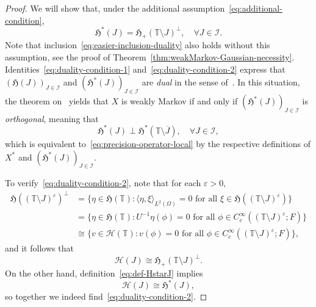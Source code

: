 \documentclass[reqno]{amsart}
\numberwithin{equation}{section}
\newcommand{\bbT}{\mathbb{T}}
\newcommand{\cH}{\mathcal{H}}
\newcommand{\scalar}[2]{     \langle #1       \rangle_{ #2 }}
\newcommand{\clos}[1]{\overline{ #1 }}
\theoremstyle{remark}
\theoremstyle{definition}
\begin{document}
\begin{proof}
	We will show that, under the additional assumption~\eqref{eq:additional-condition},
	\begin{equation}\label{eq:duality-condition-2}
		\mathfrak H^*(J) = \mathfrak H_+(\bbT \setminus J)^\perp, 
		\quad 
		\forall J \in \mathscr I.
	\end{equation}
	Note that inclusion~\eqref{eq:easier-inclusion-duality} also holds without this assumption,
	see the proof of Theorem~\ref{thm:weakMarkov-Gaussian-necessity}.
	Identities~\eqref{eq:duality-condition-1} and~\eqref{eq:duality-condition-2} express that
	$(\mathfrak H(J))_{J \in \mathscr I}$ and $(\mathfrak H^*(J))_{J \in \mathscr I}$ are \emph{dual}
	in the sense of~\cite[Chapter~2, Section~3.5]{Rozanov1982}.
	In this situation, the theorem on~\cite[p.~100]{Rozanov1982} yields that
	$X$ is weakly Markov if and only if $(\mathfrak H^*(J))_{J \in \mathscr I}$
	is \emph{orthogonal}, meaning that
	\begin{equation}\label{eq:dual-field-orthogonal}
		\mathfrak H^*(J) \perp \mathfrak H^*(\bbT \setminus \clos J), \quad \forall J \in \mathscr I,
	\end{equation}
	which is equivalent to~\eqref{eq:precision-operator-local}
	by the respective definitions of $X^*$ and $(\mathfrak H^*(J))_{J \in \mathscr I}$.
	
	To verify~\eqref{eq:duality-condition-2}, note that for each $\varepsilon > 0$,
	\[
	\begin{aligned}
		\mathfrak H((\bbT\setminus J)^\varepsilon)^\perp 
		&=
		\{
		\eta \in \mathfrak H(\bbT) : \scalar{\eta, \xi}{L^2(\Omega)} = 0 \text{ for all } \xi \in \mathfrak H((\bbT\setminus J)^\varepsilon)
		\}
		\\
		&= 
		\{ \eta \in \mathfrak H(\bbT) : U^{-1}\eta(\phi) = 0 \text{ for all } \phi \in C_c^\infty((\bbT\setminus J)^\varepsilon; F) \}
		\\
		&\cong
		\{ v \in \cH(\bbT) : v(\phi) = 0 \text{ for all } \phi \in C_c^\infty((\bbT\setminus J)^\varepsilon; F) \},
	\end{aligned}
	\]
	and it follows that
	\begin{equation}\label{eq:RHKS-isomorphic-to-Hplusthing}
		\cH(J) \cong \mathfrak H_+(\bbT \setminus J)^\perp.
	\end{equation}
	On the other hand, definition~\eqref{eq:def-HstarJ} implies
	\[
	\cH(J) \cong \mathfrak H^*(J),
	\]
	so together we indeed find~\eqref{eq:duality-condition-2}.
\end{proof}
\end{document}
